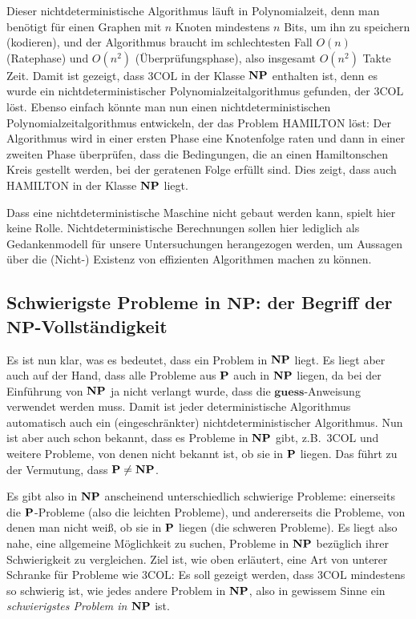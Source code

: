 Dieser nichtdeterministische Algorithmus läuft in Polynomialzeit, denn
man benötigt für einen Graphen mit $n$ Knoten mindestens $n$ Bits, um
ihn zu speichern (kodieren), und der Algorithmus braucht im
schlechtesten Fall $O(n)$ (Ratephase) und $O(n^2)$
(Überprüfungsphase), also insgesamt $O(n^2)$ Takte Zeit.  Damit ist
gezeigt, dass $3\mathrm{COL}$ in der Klasse $\NP$ enthalten ist, denn
es wurde ein nichtdeterministischer Polynomialzeitalgorithmus
gefunden, der $3\mathrm{COL}$ löst. Ebenso einfach könnte man nun
einen nichtdeterministischen Polynomialzeitalgorithmus entwickeln, der
das Problem \textsf{HAMILTON} löst: Der Algorithmus wird in einer
ersten Phase eine Knotenfolge raten und dann in einer zweiten Phase
überprüfen, dass die Bedingungen, die an einen Hamiltonschen Kreis
gestellt werden, bei der geratenen Folge erfüllt sind. Dies zeigt,
dass auch \textsf{HAMILTON} in der Klasse $\NP$ liegt.

Dass eine nichtdeterministische Maschine nicht gebaut werden kann,
spielt hier keine Rolle. Nichtdeterministische Berechnungen sollen
hier lediglich als Gedankenmodell für unsere Untersuchungen
herangezogen werden, um Aussagen über die (Nicht-) Existenz von
effizienten Algorithmen machen zu können.

\subsection{Schwierigste Probleme in $\mathbf{NP}$: der Begriff der 
$\mathbf{NP}$-Vollständigkeit}

Es ist nun klar, was es bedeutet, dass ein Problem in $\NP$ liegt. Es
liegt aber auch auf der Hand, dass alle Probleme aus $\P$ auch in
$\NP$ liegen, da bei der Einführung von $\NP$ ja nicht verlangt wurde,
dass die $\mathbf{guess}$-Anweisung verwendet werden muss. Damit ist
jeder deterministische Algorithmus automatisch auch ein
(eingeschränkter) nichtdeterministischer Algorithmus. Nun ist aber
auch schon bekannt, dass es Probleme in $\NP$ gibt, z.B.~$3\mathrm{COL}$ und
weitere Probleme, von denen nicht bekannt ist, ob sie in $\P$
liegen. Das führt zu der Vermutung, dass $\P\neq\NP$.

Es gibt also in $\NP$ anscheinend unterschiedlich schwierige Probleme:
einerseits die $\P$-Probleme (also die leichten Probleme), und
andererseits die Probleme, von denen man nicht weiß, ob sie in $\P$
liegen (die schweren Probleme).  Es liegt also nahe, eine allgemeine
Möglichkeit zu suchen, Probleme in $\NP$ bezüglich ihrer Schwierigkeit
zu vergleichen. Ziel ist, wie oben erläutert, eine Art von unterer
Schranke für Probleme wie $3\mathrm{COL}$: Es soll gezeigt werden,
dass $3\mathrm{COL}$ mindestens so schwierig ist, wie jedes andere
Problem in $\NP$, also in gewissem Sinne ein \emph{schwierigstes
Problem in $\NP$} ist.

